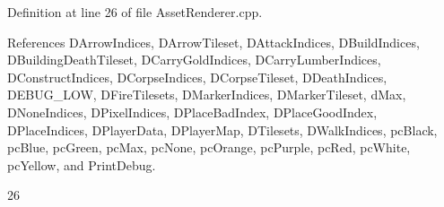 Definition at line 26 of file Asset\+Renderer.\+cpp.



References D\+Arrow\+Indices, D\+Arrow\+Tileset, D\+Attack\+Indices, D\+Build\+Indices, D\+Building\+Death\+Tileset, D\+Carry\+Gold\+Indices, D\+Carry\+Lumber\+Indices, D\+Construct\+Indices, D\+Corpse\+Indices, D\+Corpse\+Tileset, D\+Death\+Indices, D\+E\+B\+U\+G\+\_\+\+L\+OW, D\+Fire\+Tilesets, D\+Marker\+Indices, D\+Marker\+Tileset, d\+Max, D\+None\+Indices, D\+Pixel\+Indices, D\+Place\+Bad\+Index, D\+Place\+Good\+Index, D\+Place\+Indices, D\+Player\+Data, D\+Player\+Map, D\+Tilesets, D\+Walk\+Indices, pc\+Black, pc\+Blue, pc\+Green, pc\+Max, pc\+None, pc\+Orange, pc\+Purple, pc\+Red, pc\+White, pc\+Yellow, and Print\+Debug.


\begin{DoxyCode}
26                                                                                                            
                                                                                                                  

\end{DoxyCode}
